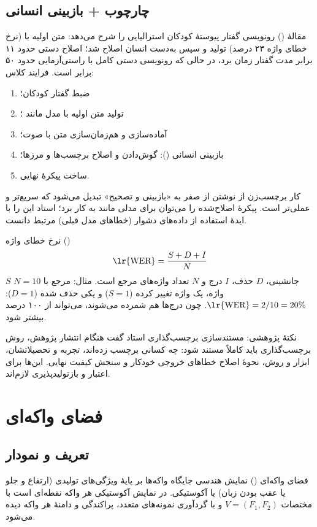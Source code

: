 \subsection{چارچوب  + بازبینی انسانی}
مقالهٔ  () رونویسی گفتار پیوستهٔ کودکان استرالیایی را شرح می‌دهد: متن اولیه با  (نرخ خطای واژه ۲۳ درصد) تولید و سپس به‌دست انسان اصلاح شد؛ اصلاح دستی حدود ۱۱ برابر مدت گفتار زمان برد، در حالی که رونویسی دستی کامل با راستی‌آزمایی حدود ۵۰ برابر است. فرایند کلاس:
\begin{enumerate}
  \item ضبط گفتار کودکان؛
  \item تولید متن اولیه با مدل  مانند ؛
  \item آماده‌سازی  و هم‌زمان‌سازی متن با صوت؛
  \item بازبینی انسانی (): گوش‌دادن و اصلاح برچسب‌ها و مرزها؛
  \item ساخت پیکرهٔ نهایی.
\end{enumerate}
کار برچسب‌زن از نوشتن از صفر به «بازبینی و تصحیح» تبدیل می‌شود که سریع‌تر و عملی‌تر است. پیکرهٔ اصلاح‌شده را می‌توان برای  مدلی مانند  به کار برد؛ استاد این را با ایدهٔ استفاده از داده‌های دشوار (خطاهای مدل قبلی) مرتبط دانست.

\begin{definitionbox}{نرخ خطای واژه ()}
\[
\text{\lr{WER}}=\frac{S+D+I}{N}
\]
$S$ جانشینی، $D$ حذف، $I$ درج و $N$ تعداد واژه‌های مرجع است. مثال: مرجع با $N=10$ واژه، یک واژه تغییر کرده ($S=1$) و یکی حذف شده ($D=1$): $\text{\lr{WER}}=2/10=20\%$. چون درج‌ها هم شمرده می‌شوند،  می‌تواند از ۱۰۰ درصد بیشتر شود.
\end{definitionbox}

\begin{exambox}{نکتهٔ پژوهشی: مستندسازی برچسب‌گذاری}
استاد گفت هنگام انتشار پژوهش، روش برچسب‌گذاری باید کاملاً مستند شود: چه کسانی برچسب زده‌اند، تجربه و تحصیلاتشان، ابزار و روش، نحوهٔ اصلاح خطاهای خروجی خودکار و سنجش کیفیت نهایی. این‌ها برای اعتبار و بازتولیدپذیری لازم‌اند.
\end{exambox}

\section{فضای واکه‌ای}
\subsection{تعریف و نمودار }
\begin{definitionbox}{فضای واکه‌ای ()}
نمایش هندسی جایگاه واکه‌ها بر پایهٔ ویژگی‌های تولیدی (ارتفاع و جلو یا عقب بودن زبان) یا آکوستیکی. در نمایش آکوستیکی هر واکه نقطه‌ای است با مختصات $V=(F_1,F_2)$ و با گردآوری نمونه‌های متعدد، پراکندگی و دامنهٔ هر واکه دیده می‌شود.
\end{definitionbox}

